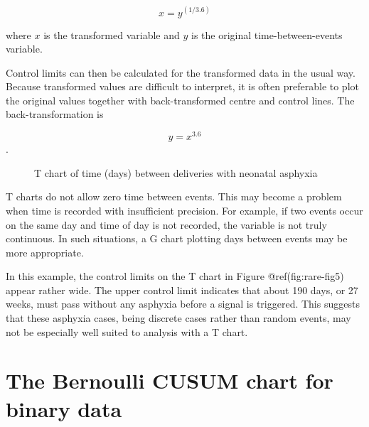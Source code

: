 \documentclass[
]{book}
\makeatletter
\newenvironment{Shaded}{\begin{snugshade}}{\end{snugshade}}
\newcommand{\AttributeTok}[1]{\textcolor[rgb]{0.13,0.29,0.53}{#1}}
\newcommand{\CommentTok}[1]{\textcolor[rgb]{0.56,0.35,0.01}{\textit{#1}}}
\newcommand{\FunctionTok}[1]{\textcolor[rgb]{0.13,0.29,0.53}{\textbf{#1}}}
\newcommand{\NormalTok}[1]{#1}
\newcommand{\OtherTok}[1]{\textcolor[rgb]{0.56,0.35,0.01}{#1}}
\newcommand{\SpecialCharTok}[1]{\textcolor[rgb]{0.81,0.36,0.00}{\textbf{#1}}}
\newcommand{\StringTok}[1]{\textcolor[rgb]{0.31,0.60,0.02}{#1}}
\newcommand*\pandocbounded[1]{%
  \sbox\pandoc@box{#1}%
  \Gscale@div\@tempa{\textheight}{\dimexpr\ht\pandoc@box+\dp\pandoc@box\relax}%
  \Gscale@div\@tempb{\linewidth}{\wd\pandoc@box}%
  \ifdim\@tempb\p@<\@tempa\p@\let\@tempa\@tempb\fi%
  \ifdim\@tempa\p@<\p@\scalebox{\@tempa}{\usebox\pandoc@box}%
  \else\usebox{\pandoc@box}%
  \fi%
}
\makeatother
\begin{document}
\[x = y^{(1 / 3.6)}\]

where \(x\) is the transformed variable and \(y\) is the original
time-between-events variable.

Control limits can then be calculated for the transformed data in the
usual way. Because transformed values are difficult to interpret, it is
often preferable to plot the original values together with
back-transformed centre and control lines. The back-transformation is

\[y=x^{3.6}\].

\begin{Shaded}
\end{Shaded}

\begin{figure}
\centering
\pandocbounded{}
\caption{T chart of time (days) between deliveries with neonatal
asphyxia}
\end{figure}

T charts do not allow zero time between events. This may become a
problem when time is recorded with insufficient precision. For example,
if two events occur on the same day and time of day is not recorded, the
variable is not truly continuous. In such situations, a G chart plotting
days between events may be more appropriate.

In this example, the control limits on the T chart in Figure
@ref(fig:rare-fig5) appear rather wide. The upper control limit
indicates that about 190 days, or 27 weeks, must pass without any
asphyxia before a signal is triggered. This suggests that these asphyxia
cases, being discrete cases rather than random events, may not be
especially well suited to analysis with a T chart.

\section{The Bernoulli CUSUM chart for binary
data}\label{the-bernoulli-cusum-chart-for-binary-data}
\end{document}
